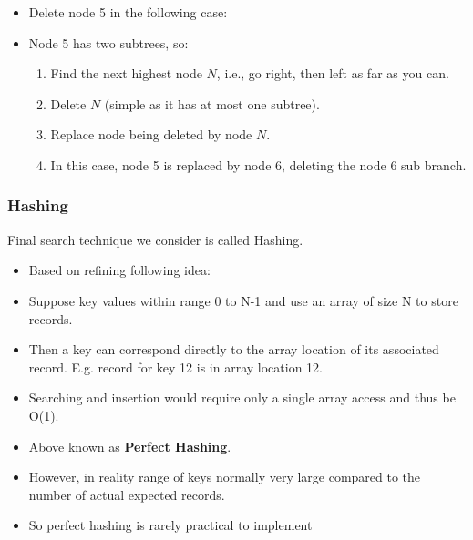 \documentclass[a4paper,12pt]{article}
\begin{document}
\begin{itemize}
    \item Delete node 5 in the following case:
\end{itemize}

\begin{center}
\end{center}

\begin{itemize}
    \item Node 5 has two subtrees, so:
    \begin{enumerate}
        \item Find the next highest node \(N\), i.e., go right, then left as far as you can.
        \item Delete \(N\) (simple as it has at most one subtree).
        \item Replace node being deleted by node \(N\).
        \item In this case, node 5 is replaced by node 6, deleting the node 6 sub branch.
    \end{enumerate}
\end{itemize}

\subsubsection{Hashing}

Final search technique we consider is called Hashing.
\begin{itemize}
    \item Based on refining following idea:
    \item Suppose key values within range 0 to N-1 and use an array of size N to store records.
    \item Then a key can correspond directly to the array location of its associated record. E.g. record for key 12 is in array location 12.
\item Searching and insertion would require only a single array access and thus be O(1).
\item Above known as \textbf{Perfect Hashing}.
\item However, in reality range of keys normally very large compared to the number of actual expected records.
\item So perfect hashing is rarely practical to implement
\end{itemize}
\end{document}
